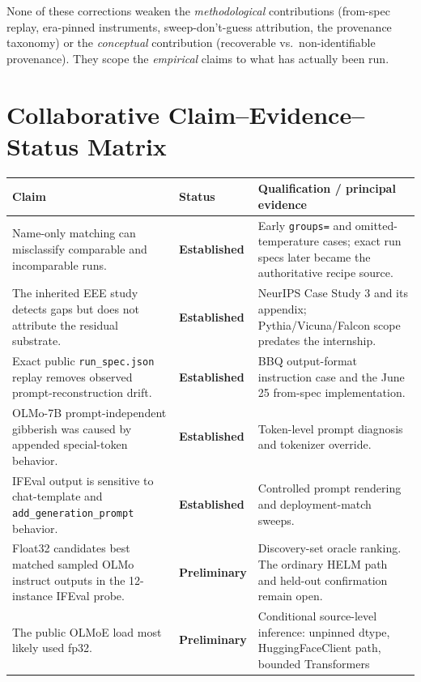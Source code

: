 \documentclass[11pt]{report}
\newcommand{\code}[1]{\texttt{#1}}
\newcommand{\file}[1]{\texttt{#1}}
\newcommand{\statusEstablished}{\textbf{Established}}
\newcommand{\statusPreliminary}{\textbf{Preliminary}}
\begin{document}
None of these corrections weaken the \emph{methodological} contributions (from-spec
replay, era-pinned instruments, sweep-don't-guess attribution, the provenance
taxonomy) or the \emph{conceptual} contribution (recoverable vs.\ non-identifiable
provenance). They scope the \emph{empirical} claims to what has actually been run.



\chapter{Collaborative Claim--Evidence--Status Matrix}
\label{app:master-claim-matrix}

\begin{longtable}{@{}p{}p{}p{}@{}}
\toprule
\textbf{Claim} & \textbf{Status} & \textbf{Qualification / principal evidence} \\
\midrule
\endhead
Name-only matching can misclassify comparable and incomparable runs. &
\statusEstablished & Early \code{groups=} and omitted-temperature cases; exact run
specs later became the authoritative recipe source. \\
The inherited EEE study detects gaps but does not attribute the residual substrate. &
\statusEstablished & NeurIPS Case Study 3 and its appendix; Pythia/Vicuna/Falcon
scope predates the internship. \\
Exact public \file{run\_spec.json} replay removes observed prompt-reconstruction
drift. & \statusEstablished & BBQ output-format instruction case and the June 25
from-spec implementation. \\
OLMo-7B prompt-independent gibberish was caused by appended special-token behavior. &
\statusEstablished & Token-level prompt diagnosis and tokenizer override. \\
IFEval output is sensitive to chat-template and
\code{add\_generation\_prompt} behavior. & \statusEstablished & Controlled prompt
rendering and deployment-match sweeps. \\
Float32 candidates best matched sampled OLMo instruct outputs in the 12-instance
IFEval probe. & \statusPreliminary & Discovery-set oracle ranking. The ordinary
HELM path and held-out confirmation remain open. \\
The public OLMoE load most likely used fp32. & \statusPreliminary & Conditional
source-level inference: unpinned dtype, HuggingFaceClient path, bounded Transformers

\end{longtable}
\end{document}
